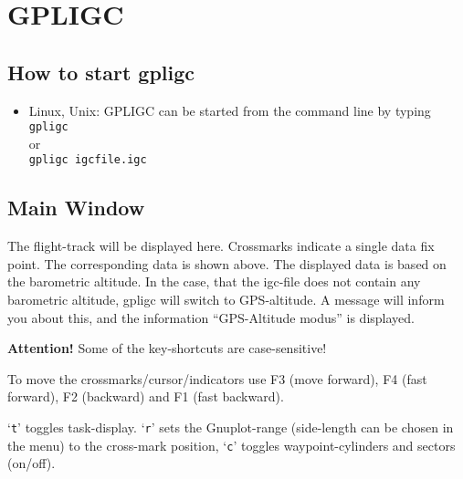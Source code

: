 

\section{GPLIGC}

\subsection{How to start gpligc}

\begin{itemize}
\item{Linux, Unix:}
GPLIGC can be started from the command line by typing \\
\texttt{gpligc}\\
or\\
\texttt{gpligc  igcfile.igc}


\end{itemize}

\subsection{Main Window}
The flight-track will be displayed here. 
Crossmarks indicate a single data fix point. 
The corresponding data is shown above.
The displayed data is based on the barometric altitude. 
In the case, that the igc-file does not contain any barometric altitude,
gpligc will switch to GPS-altitude.
A message will inform you about this, and
the information ``GPS-Altitude modus'' is displayed.

\textbf{Attention!} Some of the key-shortcuts are case-sensitive!

To move the crossmarks/cursor/indicators use F3 (move forward), F4 (fast forward), F2 (backward)  and F1 (fast backward).

`\texttt{t}' toggles task-display.
`\texttt{r}' sets the Gnuplot-range (side-length can be chosen in the menu) to the cross-mark position, 
`\texttt{c}' toggles waypoint-cylinders and sectors (on/off).

